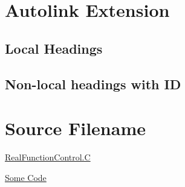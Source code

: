 
\chapter{\label{autolink-extension}Autolink Extension}
\par 
\par 
\section{\label{local-headings}Local Headings}
\par 
\par 
\section{\label{non-local-headings-with-id}Non-local headings with ID}
\par 
\par 
\chapter{\label{source-filename}Source Filename}
\par \href{XXXXXXXX-XXXX-XXXX-XXXX-XXXXXXXXXXXX}{RealFunctionControl.C}
\par \href{XXXXXXXX-XXXX-XXXX-XXXX-XXXXXXXXXXXX}{Some Code} 